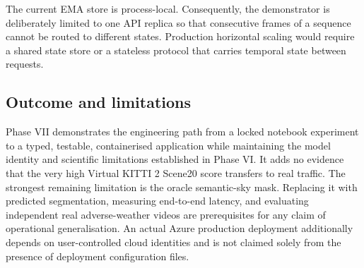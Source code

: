 The current EMA store is process-local. Consequently, the demonstrator is deliberately
limited to one API replica so that consecutive frames of a sequence cannot be routed to
different states. Production horizontal scaling would require a shared state store or a
stateless protocol that carries temporal state between requests.

\subsection{Outcome and limitations}

Phase VII demonstrates the engineering path from a locked notebook experiment to a typed,
testable, containerised application while maintaining the model identity and scientific
limitations established in Phase VI. It adds no evidence that the very high Virtual KITTI 2
Scene20 score transfers to real traffic. The strongest remaining limitation is the oracle
semantic-sky mask. Replacing it with predicted segmentation, measuring end-to-end latency,
and evaluating independent real adverse-weather videos are prerequisites for any claim of
operational generalisation. An actual Azure production deployment additionally depends on
user-controlled cloud identities and is not claimed solely from the presence of deployment
configuration files.
